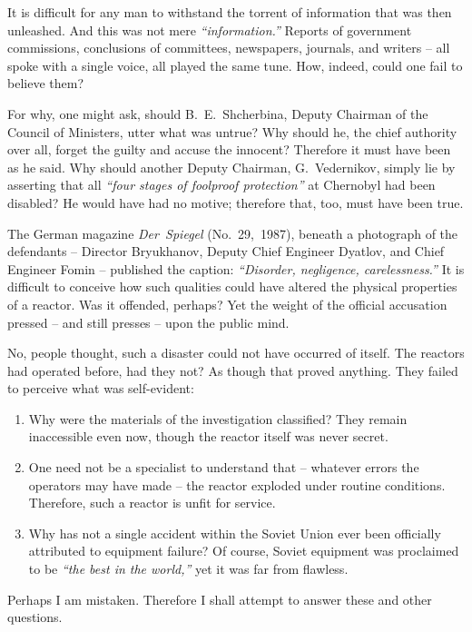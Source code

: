 \documentclass[openright]{bookest}
\begin{document}

It is difficult for any man to withstand the torrent of information that was then unleashed. And this was not mere \textit{``information.''} Reports of government commissions, conclusions of committees, newspapers, journals, and writers -- all spoke with a single voice, all played the same tune. How, indeed, could one fail to believe them?

For why, one might ask, should B.~E.~Shcherbina, Deputy Chairman of the Council of Ministers, utter what was untrue? Why should he, the chief authority over all, forget the guilty and accuse the innocent? Therefore it must have been as he said. Why should another Deputy Chairman, G.~Vedernikov, simply lie by asserting that all \textit{``four stages of foolproof protection''} at Chernobyl had been disabled? He would have had no motive; therefore that, too, must have been true.

The German magazine \textit{Der~Spiegel} (No.~29,~1987), beneath a photograph of the defendants -- Director Bryukhanov, Deputy Chief Engineer Dyatlov, and Chief Engineer Fomin -- published the caption: \textit{``Disorder, negligence, carelessness.''} It is difficult to conceive how such qualities could have altered the physical properties of a reactor. Was it offended, perhaps? Yet the weight of the official accusation pressed -- and still presses -- upon the public mind.

No, people thought, such a disaster could not have occurred of itself. The reactors had operated before, had they not? As though that proved anything. They failed to perceive what was self-evident:

\begin{enumerate}
  \item Why were the materials of the investigation classified? They remain inaccessible even now, though the reactor itself was never secret.
  \item One need not be a specialist to understand that -- whatever errors the operators may have made -- the reactor exploded under routine conditions. Therefore, such a reactor is unfit for service.
  \item Why has not a single accident within the Soviet Union ever been officially attributed to equipment failure? Of course, Soviet equipment was proclaimed to be \textit{``the best in the world,''} yet it was far from flawless.
\end{enumerate}

Perhaps I am mistaken. Therefore I shall attempt to answer these and other questions.
\end{document}
